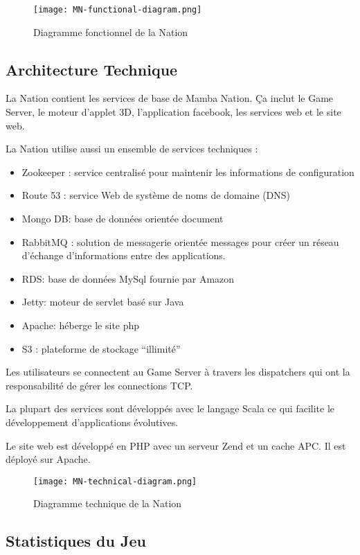\begin{figure}[H]
  \texttt{[image: MN-functional-diagram.png]}  
  \caption{Diagramme fonctionnel de la Nation}
\end{figure}

\subsection{Architecture Technique}

La Nation contient les services de base de Mamba Nation. Ça inclut le Game
Server, le moteur d'applet 3D, l'application facebook, les services web et le
site web.

La Nation utilise aussi un ensemble de services techniques :
\begin{itemize}
\item Zookeeper : service centralisé pour maintenir les informations de configuration
\item Route 53 : service Web de système de noms de domaine (DNS)
\item Mongo DB: base de données orientée document
\item RabbitMQ : solution de messagerie orientée messages pour créer un réseau
  d'échange d'informations entre des applications.
\item RDS: base de données MySql fournie par Amazon
\item Jetty: moteur de servlet basé sur Java
\item Apache: héberge le site php
\item S3 : plateforme de stockage ``illimité''
\end{itemize}

Les utilisateurs se connectent au Game Server à travers les dispatchers qui ont la
responsabilité de gérer les connections TCP.

La plupart des services sont développés avec le langage Scala ce qui facilite le
développement d'applications évolutives.

Le site web est développé en PHP avec un serveur Zend et un cache APC. Il est
déployé sur Apache.

\begin{figure}[H]
  \texttt{[image: MN-technical-diagram.png]}  
  \caption{Diagramme technique de la Nation}
\end{figure}

\subsection{Statistiques du Jeu}

